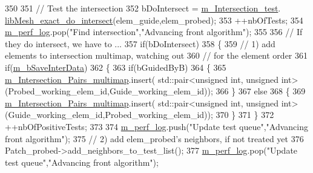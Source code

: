 \begin{DoxyCode}
350 
351                 \textcolor{comment}{// Test the intersection}
352                 bDoIntersect = \hyperlink{classcarl_1_1_intersection___search_afeedb5ff9144638151b7f956cf113fc4}{m\_Intersection\_test}.
      \hyperlink{classcarl_1_1_intersection___tools_ae7b16748a45a0579bafecb48ef2fc4ce}{libMesh\_exact\_do\_intersect}(elem\_guide,elem\_probed);
353                 ++nbOfTests;
354                 \hyperlink{classcarl_1_1_intersection___search_aebe6210287a36909206b1a59f9cd17e0}{m\_perf\_log}.pop(\textcolor{stringliteral}{"Find intersection"},\textcolor{stringliteral}{"Advancing front algorithm"});
355 
356                 \textcolor{comment}{// If they do intersect, we have to ...}
357                 \textcolor{keywordflow}{if}(bDoIntersect)
358                 \{
359                     \textcolor{comment}{// 1) add elements to intersection multimap, watching out}
360                     \textcolor{comment}{//    for the element order}
361                     \textcolor{keywordflow}{if}(\hyperlink{classcarl_1_1_intersection___search_a8f20721814d9dcfab34a0b6c85b88f3c}{m\_bSaveInterData})
362                     \{
363                         \textcolor{keywordflow}{if}(bGuidedByB)
364                         \{
365                             \hyperlink{classcarl_1_1_intersection___search_a21bb47bfa3021d18b718919ad4a245d7}{m\_Intersection\_Pairs\_multimap}.insert(
      std::pair<unsigned int, unsigned int>(Probed\_working\_elem\_id,Guide\_working\_elem\_id));
366                         \}
367                         \textcolor{keywordflow}{else}
368                         \{
369                             \hyperlink{classcarl_1_1_intersection___search_a21bb47bfa3021d18b718919ad4a245d7}{m\_Intersection\_Pairs\_multimap}.insert(
      std::pair<unsigned int, unsigned int>(Guide\_working\_elem\_id,Probed\_working\_elem\_id));
370                         \}
371                     \}
372                     ++nbOfPositiveTests;
373 
374                     \hyperlink{classcarl_1_1_intersection___search_aebe6210287a36909206b1a59f9cd17e0}{m\_perf\_log}.push(\textcolor{stringliteral}{"Update test queue"},\textcolor{stringliteral}{"Advancing front algorithm"});
375                     \textcolor{comment}{// 2) add elem\_probed's neighbors, if not treated yet}
376                     Patch\_probed->add\_neighbors\_to\_test\_list();
377                     \hyperlink{classcarl_1_1_intersection___search_aebe6210287a36909206b1a59f9cd17e0}{m\_perf\_log}.pop(\textcolor{stringliteral}{"Update test queue"},\textcolor{stringliteral}{"Advancing front algorithm"});

\end{DoxyCode}
